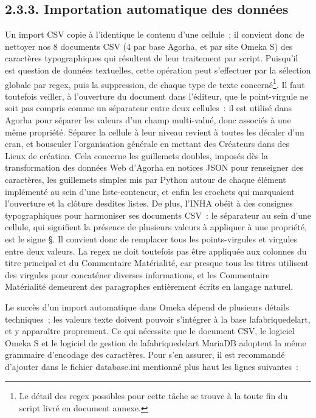 \documentclass[a4paper,12pt, twoside]{book}
\begin{document}
\subsection*{2.3.3. Importation automatique des données}

Un import CSV copie à l’identique le contenu d’une cellule~; il convient donc de nettoyer nos 8 documents CSV (4 par base Agorha, et par site Omeka S) des caractères typographiques qui résultent de leur traitement par script. Puisqu’il est question de données textuelles, cette opération peut s’effectuer par la sélection globale par regex, puis la suppression, de chaque type de texte concerné\footnote{Le détail des regex possibles pour cette tâche se trouve à la toute fin du script livré en document annexe.}. Il faut toutefois veiller, à l’ouverture du document dans l’éditeur, que le point-virgule ne soit pas compris comme un séparateur entre deux cellules~: il est utilisé dans Agorha pour séparer les valeurs d’un champ multi-valué, donc associés à une même propriété. Séparer la cellule à leur niveau revient à toutes les décaler d’un cran, et bousculer l’organisation générale en mettant des \textsf{Créateurs} dans des \textsf{Lieux de création}. Cela concerne les guillemets doubles, imposés dès la transformation des données Web d’Agorha en notices JSON pour renseigner des caractères, les guillemets simples mis par Python autour de chaque élément implémenté au sein d’une liste-conteneur, et enfin les crochets qui marquaient l’ouverture et la clôture desdites listes. De plus, l’INHA obéit à des consignes typographiques pour harmoniser ses documents CSV~: le séparateur au sein d’une cellule, qui signifient la présence de plusieurs valeurs à appliquer à une propriété, est le signe \textsf{\S}. Il convient donc de remplacer tous les points-virgules et virgules entre deux valeurs. La regex ne doit toutefois pas être appliquée aux colonnes du titre principal et du \textsf{Commentaire Matérialité}, car presque tous les titres utilisent des virgules pour concaténer diverses informations, et les \textsf{Commentaire Matérialité} demeurent des paragraphes entièrement écrits en langage naturel.

Le succès d’un import automatique dans Omeka dépend de plusieurs détails techniques~; les valeurs texte doivent pouvoir s’intégrer à la base \textsf{lafabriquedelart}, et y apparaître proprement. Ce qui nécessite que le document CSV, le logiciel Omeka S et le logiciel de gestion de \textsf{lafabriquedelart} MariaDB adoptent la même grammaire d’encodage des caractères. Pour s’en assurer, il est recommandé d’ajouter dans le fichier \textsf{database.ini} mentionné plus haut les lignes suivantes~:
\end{document}
